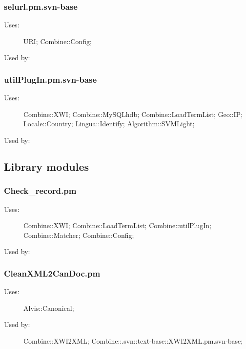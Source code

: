 \subsubsection{selurl.pm.svn-base}
\begin{description}
\item[Uses:] URI; Combine::Config; 

\item[Used by:] 

\end{description}
\subsubsection{utilPlugIn.pm.svn-base}
\begin{description}
\item[Uses:] Combine::XWI; Combine::MySQLhdb; Combine::LoadTermList; Geo::IP; Locale::Country; Lingua::Identify; Algorithm::SVMLight; 

\item[Used by:] 

\end{description}
\subsection{Library modules}
\subsubsection{Check\_record.pm}
\begin{description}
\item[Uses:] Combine::XWI; Combine::LoadTermList; Combine::utilPlugIn; Combine::Matcher; Combine::Config; 

\item[Used by:] 

\end{description}
\subsubsection{CleanXML2CanDoc.pm}
\begin{description}
\item[Uses:] Alvis::Canonical; 

\item[Used by:] Combine::XWI2XML; Combine::.svn::text-base::XWI2XML.pm.svn-base; 

\end{description}
